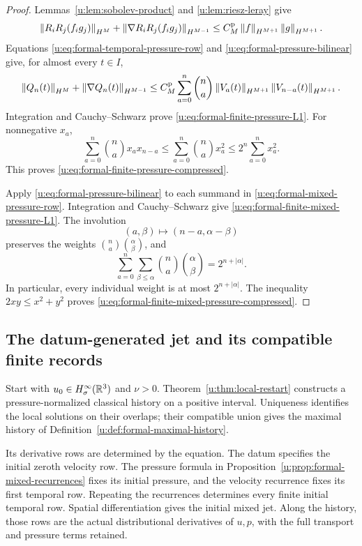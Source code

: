 \begin{proof}
Lemmas~\ref{u:lem:sobolev-product} and \ref{u:lem:riesz-leray} give
\begin{equation}
 \left\lVert R_iR_j(f_i g_j)\right\rVert_{H^M}
 +\left\lVert \nabla R_iR_j(f_i g_j)\right\rVert_{H^{M-1}}
 \le C_M^{\rm p}\left\lVert f\right\rVert_{H^{M+1}}\left\lVert g\right\rVert_{H^{M+1}}.
 \label{u:eq:formal-pressure-bilinear}
\end{equation}
Equations \eqref{u:eq:formal-temporal-pressure-row} and
\eqref{u:eq:formal-pressure-bilinear} give, for almost every \(t\in I\),
\[
 \left\lVert Q_n(t)\right\rVert_{H^M}
 +\left\lVert \nabla Q_n(t)\right\rVert_{H^{M-1}}
 \le
 C_M^{\rm p}\sum_{a=0}^{n}\binom na
 \left\lVert V_a(t)\right\rVert_{H^{M+1}}
 \left\lVert V_{n-a}(t)\right\rVert_{H^{M+1}}.
\]
Integration and Cauchy--Schwarz prove
\eqref{u:eq:formal-finite-pressure-L1}.  For nonnegative \(x_a\),
\[
 \sum_{a=0}^{n}\binom nax_ax_{n-a}
 \le
 \sum_{a=0}^{n}\binom nax_a^2
 \le
 2^n\sum_{a=0}^{n}x_a^2.
\]
This proves \eqref{u:eq:formal-finite-pressure-compressed}.

Apply \eqref{u:eq:formal-pressure-bilinear} to each summand in
\eqref{u:eq:formal-mixed-pressure-row}.  Integration and Cauchy--Schwarz give
\eqref{u:eq:formal-finite-mixed-pressure-L1}.  The involution
\[
 (a,\beta)\longmapsto(n-a,\alpha-\beta)
\]
preserves the weights
\(\binom na\binom{\alpha}{\beta}\), and
\[
 \sum_{a=0}^{n}\sum_{\beta\le\alpha}
 \binom na\binom{\alpha}{\beta}
 =2^{n+|\alpha|}.
\]
In particular, every individual weight is at most \(2^{n+|\alpha|}\).
The inequality \(2xy\le x^2+y^2\) proves
\eqref{u:eq:formal-finite-mixed-pressure-compressed}.
\end{proof}


\subsection{The datum-generated jet and its compatible finite records}
\label{u:sec:independent-intersection}

Start with \(u_0\in H^\infty_\sigma(\mathbb R^3)\) and \(\nu>0\).
Theorem~\ref{u:thm:local-restart} constructs a pressure-normalized classical
history on a positive interval. Uniqueness identifies the local solutions
on their overlaps; their compatible union gives the maximal history of
Definition~\ref{u:def:formal-maximal-history}.

Its derivative rows are determined by the equation. The datum specifies
the initial zeroth velocity row. The pressure formula in
Proposition~\ref{u:prop:formal-mixed-recurrences} fixes its initial pressure,
and the velocity recurrence fixes its first temporal row.
Repeating the recurrences determines
every finite initial temporal row. Spatial differentiation gives the
initial mixed jet. Along the history, those rows are the actual
distributional derivatives of \(u,p\), with the full transport and pressure
terms retained.

